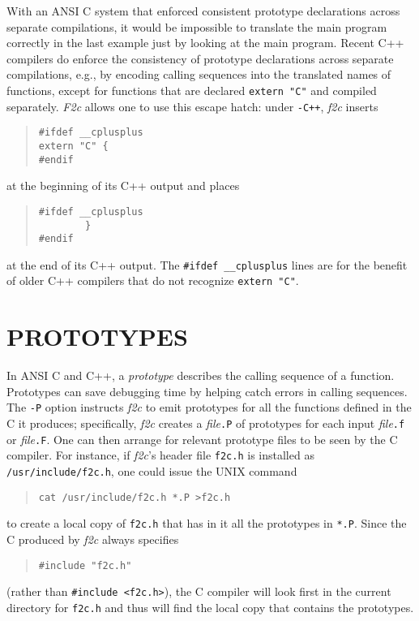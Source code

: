 \documentclass[12pt]{article}
\begin{document}
With an ANSI C system that enforced consistent prototype declarations across separate compilations, it would be impossible to translate the main program correctly in the last example just by looking at the main program. Recent C++ compilers do enforce the consistency of prototype declarations across separate compilations, e.g., by encoding calling sequences into the translated names of functions, except for functions that are declared \verb|extern "C"| and compiled separately. \emph{F2c} allows one to use this escape hatch: under \verb|-C++|, \emph{f2c} inserts
\begin{quote}
\begin{verbatim}
#ifdef __cplusplus
extern "C" {
#endif
\end{verbatim}
\end{quote}
at the beginning of its C++ output and places
\begin{quote}
\begin{verbatim}
#ifdef __cplusplus
        }
#endif
\end{verbatim}
\end{quote}
at the end of its C++ output. The \verb|#ifdef __cplusplus| lines are for the benefit of older C++ compilers that do not recognize \verb|extern "C"|.

\section{PROTOTYPES}

In ANSI C and C++, a \emph{prototype} describes the calling sequence of a function. Prototypes can save debugging time by helping catch errors in calling sequences. The \verb|-P| option instructs \emph{f2c} to emit prototypes for all the functions defined in the C it produces; specifically, \emph{f2c} creates a \emph{file}\verb|.P| of prototypes for each input \emph{file}\verb|.f| or \emph{file}\verb|.F|. One can then arrange for relevant prototype files to be seen by the C compiler. For instance, if \emph{f2c}’s header file \verb|f2c.h| is installed as \verb|/usr/include/f2c.h|, one could issue the UNIX command
\begin{quote}
\begin{verbatim}
cat /usr/include/f2c.h *.P >f2c.h
\end{verbatim}
\end{quote}
to create a local copy of \verb|f2c.h| that has in it all the prototypes in \verb|*.P|. Since the C produced by \emph{f2c} always specifies
\begin{quote}
\begin{verbatim}
#include "f2c.h"
\end{verbatim}
\end{quote}
(rather than \verb|#include <f2c.h>|), the C compiler will look first in the current directory for \verb|f2c.h| and thus will find the local copy that contains the prototypes.
\end{document}
